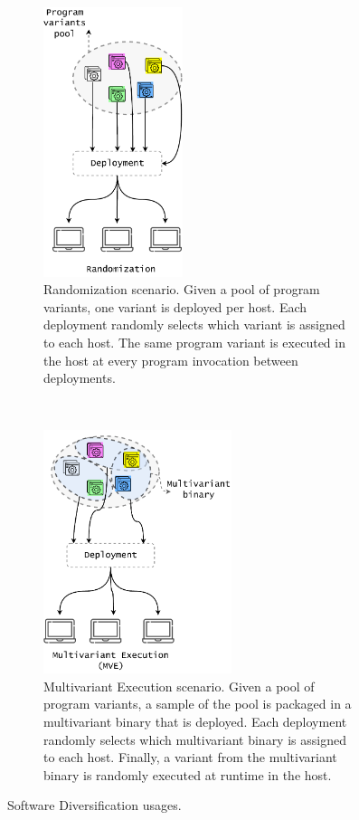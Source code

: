 \newcommand{\rulesep}{\unskip\ \vrule\ }
\begin{figure}[h]
    \centering
    \begin{subfigure}[t]{0.45\textwidth}
        \centering
        \includegraphics[height=3.1in]{diagrams/randomization.pdf}
        \vspace{0.5cm}
        \caption{Randomization scenario. Given a pool of program variants, one variant is deployed per host. Each deployment randomly selects which variant is assigned to each host. The same program variant is executed in the host at every program invocation between deployments. }        \label{diagrams:sota:randomization}

    \end{subfigure}
    \hspace{1.5mm}
    \rulesep
    \hspace{1.5mm}
    \begin{subfigure}[t]{0.45\textwidth}
        \centering
        \includegraphics[height=2.8in]{diagrams/mve.pdf}
        \caption{Multivariant Execution scenario. Given a pool of program variants, a sample of the pool is packaged in a multivariant binary that is deployed. Each deployment randomly selects which multivariant binary is assigned to each host. Finally, a variant from the multivariant binary is randomly executed at runtime in the host.}        \label{diagrams:sota:mve}

    \end{subfigure}
    \caption{Software Diversification usages.}
\end{figure}

